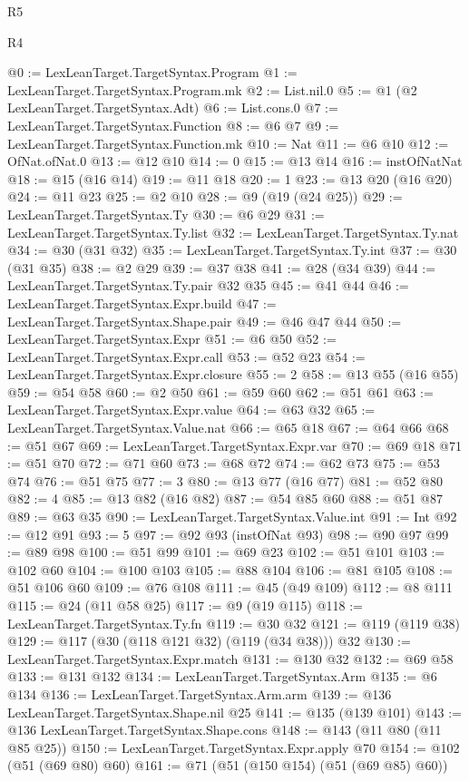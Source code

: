 \begin{lexlean}{R5}
\begin{lexlean}{R4}
\begin{coremodule}
{{{{{{{{{{{{{{{{{{{{@0 := LexLeanTarget.TargetSyntax.Program
@1 := LexLeanTarget.TargetSyntax.Program.mk
@2 := List.nil.{0}
@5 := @1 (@2 LexLeanTarget.TargetSyntax.Adt)
@6 := List.cons.{0}
@7 := LexLeanTarget.TargetSyntax.Function
@8 := @6 @7
@9 := LexLeanTarget.TargetSyntax.Function.mk
@10 := Nat
@11 := @6 @10
@12 := OfNat.ofNat.{0}
@13 := @12 @10
@14 := 0
@15 := @13 @14
@16 := instOfNatNat
@18 := @15 (@16 @14)
@19 := @11 @18
@20 := 1
@23 := @13 @20 (@16 @20)
@24 := @11 @23
@25 := @2 @10
@28 := @9 (@19 (@24 @25))
@29 := LexLeanTarget.TargetSyntax.Ty
@30 := @6 @29
@31 := LexLeanTarget.TargetSyntax.Ty.list
@32 := LexLeanTarget.TargetSyntax.Ty.nat
@34 := @30 (@31 @32)
@35 := LexLeanTarget.TargetSyntax.Ty.int
@37 := @30 (@31 @35)
@38 := @2 @29
@39 := @37 @38
@41 := @28 (@34 @39)
@44 := LexLeanTarget.TargetSyntax.Ty.pair @32 @35
@45 := @41 @44
@46 := LexLeanTarget.TargetSyntax.Expr.build
@47 := LexLeanTarget.TargetSyntax.Shape.pair
@49 := @46 @47 @44
@50 := LexLeanTarget.TargetSyntax.Expr
@51 := @6 @50
@52 := LexLeanTarget.TargetSyntax.Expr.call
@53 := @52 @23
@54 := LexLeanTarget.TargetSyntax.Expr.closure
@55 := 2
@58 := @13 @55 (@16 @55)
@59 := @54 @58
@60 := @2 @50
@61 := @59 @60
@62 := @51 @61
@63 := LexLeanTarget.TargetSyntax.Expr.value
@64 := @63 @32
@65 := LexLeanTarget.TargetSyntax.Value.nat
@66 := @65 @18
@67 := @64 @66
@68 := @51 @67
@69 := LexLeanTarget.TargetSyntax.Expr.var
@70 := @69 @18
@71 := @51 @70
@72 := @71 @60
@73 := @68 @72
@74 := @62 @73
@75 := @53 @74
@76 := @51 @75
@77 := 3
@80 := @13 @77 (@16 @77)
@81 := @52 @80
@82 := 4
@85 := @13 @82 (@16 @82)
@87 := @54 @85 @60
@88 := @51 @87
@89 := @63 @35
@90 := LexLeanTarget.TargetSyntax.Value.int
@91 := Int
@92 := @12 @91
@93 := 5
@97 := @92 @93 (instOfNat @93)
@98 := @90 @97
@99 := @89 @98
@100 := @51 @99
@101 := @69 @23
@102 := @51 @101
@103 := @102 @60
@104 := @100 @103
@105 := @88 @104
@106 := @81 @105
@108 := @51 @106 @60
@109 := @76 @108
@111 := @45 (@49 @109)
@112 := @8 @111
@115 := @24 (@11 @58 @25)
@117 := @9 (@19 @115)
@118 := LexLeanTarget.TargetSyntax.Ty.fn
@119 := @30 @32
@121 := @119 (@119 @38)
@129 := @117 (@30 (@118 @121 @32) (@119 (@34 @38))) @32
@130 := LexLeanTarget.TargetSyntax.Expr.match
@131 := @130 @32
@132 := @69 @58
@133 := @131 @132
@134 := LexLeanTarget.TargetSyntax.Arm
@135 := @6 @134
@136 := LexLeanTarget.TargetSyntax.Arm.arm
@139 := @136 LexLeanTarget.TargetSyntax.Shape.nil @25
@141 := @135 (@139 @101)
@143 := @136 LexLeanTarget.TargetSyntax.Shape.cons
@148 := @143 (@11 @80 (@11 @85 @25))
@150 := LexLeanTarget.TargetSyntax.Expr.apply @70
@154 := @102 (@51 (@69 @80) @60)
@161 := @71 (@51 (@150 @154) (@51 (@69 @85) @60))
}}}}}}}}}}}}}}}}}}}}
\end{coremodule}
\end{lexlean}
\end{lexlean}
